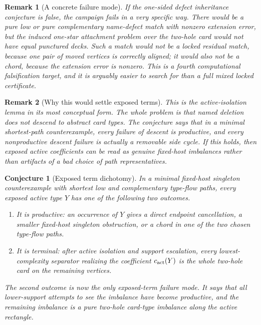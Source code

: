 \documentclass[11pt]{article}
\newtheorem{conjecture}{Conjecture}
\newtheorem{remark}{Remark}
\begin{document}
\begin{remark}[A concrete failure mode]
If the one-sided defect inheritance conjecture is false, the campaign fails in
a very specific way.  There would be a pure low or pure complementary
name-defect match with nonzero extension error, but the induced one-star
attachment problem over the two-hole card would not have equal punctured decks.
Such a match would not be a locked residual match, because one pair of moved
vertices is correctly aligned; it would also not be a chord, because the
extension error is nonzero.  This is a fourth computational falsification
target, and it is arguably easier to search for than a full mixed locked
certificate.
\end{remark}

\begin{remark}[Why this would settle exposed terms]
This is the active-isolation lemma in its most conceptual form.  The whole
problem is that named deletion does not descend to abstract card types.  The
conjecture says that in a minimal shortest-path counterexample, every failure
of descent is productive, and every nonproductive descent failure is actually
a removable side cycle.  If this holds, then exposed active coefficients can
be read as genuine fixed-host imbalances rather than artifacts of a bad choice
of path representatives.
\end{remark}

\begin{conjecture}[Exposed term dichotomy]
In a minimal fixed-host singleton counterexample with shortest low and
complementary type-flow paths, every exposed active type \(Y\) has one of the
following two outcomes.

\begin{enumerate}[leftmargin=2em]
  \item It is productive: an occurrence of \(Y\) gives a direct endpoint
  cancellation, a smaller fixed-host singleton obstruction, or a chord in one
  of the two chosen type-flow paths.

  \item It is terminal: after active isolation and support escalation, every
  lowest-complexity separator realizing the coefficient \(c_{\rm act}(Y)\) is
  the whole two-hole card on the remaining vertices.
\end{enumerate}

The second outcome is now the only exposed-term failure mode.  It says that
all lower-support attempts to see the imbalance have become productive, and
the remaining imbalance is a pure two-hole card-type imbalance along the
active rectangle.
\end{conjecture}
\end{document}
